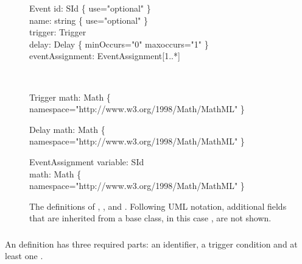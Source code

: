 \begin{figure}[htb]
  \centering
  \begin{blockChanged}
  \begin{classbox}{Event}
    id: SId  \{ use="optional" \}                                   \\
    name: string \{ use="optional" \}                               \\
    trigger: Trigger                                                \\
    delay: Delay \{ minOccurs="0" maxoccurs="1" \}                  \\
    eventAssignment: EventAssignment[1..*]                          \\
  \end{classbox} \\
  \vspace*{2ex}
  \begin{classbox}{Trigger}
    math: Math \{ namespace="http://www.w3.org/1998/Math/MathML" \} \\
  \end{classbox}
  \vspace*{2ex}
  \begin{classbox}{Delay}
    math: Math \{ namespace="http://www.w3.org/1998/Math/MathML" \} \\
  \end{classbox}
  \vspace*{2ex}
  \begin{classbox}{EventAssignment}
    variable: SId                                                   \\
    math: Math \{ namespace="http://www.w3.org/1998/Math/MathML" \} \\
  \end{classbox}
  \end{blockChanged}
  \caption{The definitions of \Event, \Trigger, \Delay and
    \EventAssignment.  Following UML notation, additional fields
    that are inherited from a base class, in this case \SBase, are
    not shown.}
  \label{fig:event}
\end{figure}


\subsubsection{}

An \Event definition has three required parts: an identifier, a
trigger condition and at least one \EventAssignment.  


